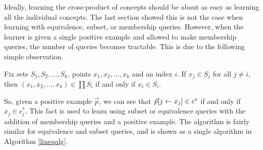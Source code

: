 Ideally, learning the cross-product of concepts should be about as easy as learning all the individual concepts.
The last section showed this is not the case when learning with equivalence, subset, or membership queries.
However, when the learner is given a single positive example and allowed to make membership queries, the number of queries becomes tractable. 
This is due to the following simple observation.

\begin{observation}
\label{posobs}
Fix sets $S_1, S_2, \dots, S_k$, points $x_1, x_2, \dots, x_k$ and an index $i$. 
If $x_j \in S_j$ for all $j \ne i$, then $(x_1, x_2, \dots, x_k) \in \prod S_i$ if and only if $x_i \in S_i$.
\end{observation}

So, given a positive example $\vec{p}$,  we can see that $\vec{p}[j \leftarrow x_j] \in c^*$ if and only if $x_j \in c^*_j$.
This fact is used to learn using subset or equivalence queries with the addition of membership queries and a positive example.
The algorithm is fairly similar for equivalence and subset queries, and is shown as a single algorithm in Algorithm \ref{lineqalg}.
 


